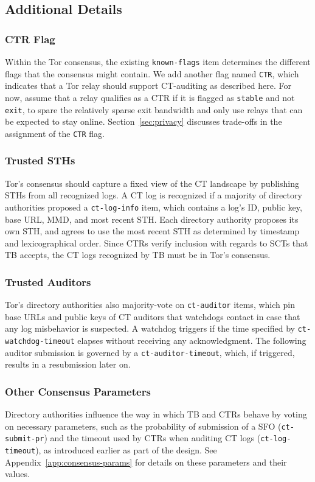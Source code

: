 \subsection{Additional Details} \label{sec:base:consensus}

\subsubsection{CTR Flag} \label{sec:base:consensus:ctr-flag} Within the Tor
consensus, the existing \texttt{known-flags} item determines the different flags
that the consensus might contain.  We add another flag named \texttt{CTR}, which
indicates that a Tor relay should support CT-auditing as described here. For
now, assume that a relay qualifies as a CTR if it is flagged as \texttt{stable}
and not \texttt{exit}, to spare the relatively sparse exit bandwidth and only
use relays that can be expected to stay online. Section~\ref{sec:privacy}
discusses trade-offs in the assignment of the \texttt{CTR} flag.

\subsubsection{Trusted STHs}
Tor's consensus should capture a fixed view of the CT landscape by publishing
STHs from all recognized logs.  A CT log is recognized if a majority of
directory authorities proposed a \texttt{ct-log-info} item, which contains a
log's ID, public key, base URL, MMD, and most recent STH\@.  Each directory
authority proposes its own STH, and agrees to use the most recent STH as
determined by timestamp and lexicographical order.  Since CTRs verify inclusion
with regards to SCTs that TB accepts, the CT logs recognized by TB must be in
Tor's consensus.

\subsubsection{Trusted Auditors}
Tor's directory authorities also majority-vote on \texttt{ct-auditor} items,
which pin base URLs and public keys of CT auditors that watchdogs contact in
case that any log misbehavior is suspected.  A watchdog triggers if the time
specified by \texttt{ct-watchdog-timeout} elapses without receiving any
acknowledgment.  The following auditor submission is governed by a
\texttt{ct-auditor-timeout}, which, if triggered, results in a resubmission
later on.

\subsubsection{Other Consensus Parameters} \label{sec:base:consensus:params}
Directory authorities influence the way in which TB and CTRs behave by voting on
necessary parameters, such as the probability of submission of a SFO
(\texttt{ct-submit-pr}) and the timeout used by CTRs when auditing CT logs
(\texttt{ct-log-timeout}), as introduced earlier as part of the design. See
Appendix~\ref{app:consensus-params} for details on these parameters and their
values.
